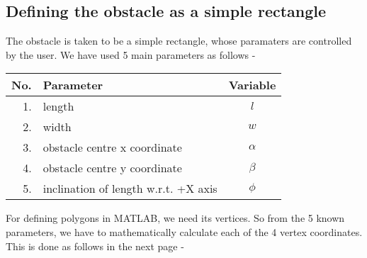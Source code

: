 \documentclass[12pt]{article}
\begin{document}
\subsection{Defining the obstacle as a simple rectangle}
The obstacle is taken to be a simple rectangle, whose paramaters are controlled by the user. We have used 5 main parameters as follows -
\begin{flushleft}
\begin{tabular}{|r|l|c|}
\hline
\textbf{No.} & \textbf{Parameter} & \textbf{Variable} \\
\hline
1. & length & $l$ \\
\hline
2. & width & $w$ \\
\hline
3. & obstacle centre x coordinate & $\alpha$ \\
\hline
4. & obstacle centre y coordinate & $\beta$ \\
\hline
5. & inclination of length w.r.t. +X axis & $\phi$ \\
\hline
\end{tabular}
\end{flushleft}
For defining polygons in MATLAB, we need its vertices. So from the 5 known parameters, we have to mathematically calculate each of the 4 vertex coordinates. This is done as follows in the next page - 
\end{document}
